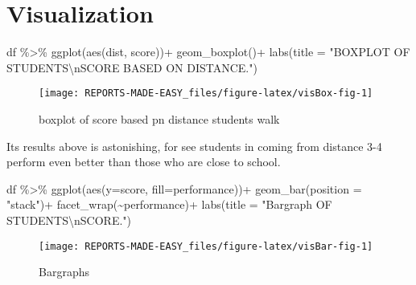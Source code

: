 \documentclass[
]{book}
\newenvironment{Shaded}{\begin{snugshade}}{\end{snugshade}}
\newcommand{\AttributeTok}[1]{\textcolor[rgb]{0.77,0.63,0.00}{#1}}
\newcommand{\FunctionTok}[1]{\textcolor[rgb]{0.00,0.00,0.00}{#1}}
\newcommand{\NormalTok}[1]{#1}
\newcommand{\SpecialCharTok}[1]{\textcolor[rgb]{0.00,0.00,0.00}{#1}}
\newcommand{\StringTok}[1]{\textcolor[rgb]{0.31,0.60,0.02}{#1}}
\begin{document}
\hypertarget{vis}{%
\section{Visualization}\label{vis}}

\begin{Shaded}
\begin{Highlighting}[]
\NormalTok{df }\SpecialCharTok{\%\textgreater{}\%} 
  \FunctionTok{ggplot}\NormalTok{(}\FunctionTok{aes}\NormalTok{(dist, score))}\SpecialCharTok{+}
  \FunctionTok{geom\_boxplot}\NormalTok{()}\SpecialCharTok{+}
  \FunctionTok{labs}\NormalTok{(}\AttributeTok{title =} \StringTok{"BOXPLOT OF STUDENTS\textquotesingle{}}\SpecialCharTok{\textbackslash{}n}\StringTok{SCORE BASED ON DISTANCE."}\NormalTok{)}
\end{Highlighting}
\end{Shaded}

\begin{figure}

{\centering \texttt{[image: REPORTS-MADE-EASY\_files/figure-latex/visBox-fig-1]} 

}

\caption{boxplot of score based pn distance students walk}\label{fig:visBox-fig}
\end{figure}

Its results above is astonishing, for see students in coming from distance 3-4 perform even better than those who are close to school.

\begin{Shaded}
\begin{Highlighting}[]
\NormalTok{df }\SpecialCharTok{\%\textgreater{}\%} 
  \FunctionTok{ggplot}\NormalTok{(}\FunctionTok{aes}\NormalTok{(}\AttributeTok{y=}\NormalTok{score, }\AttributeTok{fill=}\NormalTok{performance))}\SpecialCharTok{+}
  \FunctionTok{geom\_bar}\NormalTok{(}\AttributeTok{position =} \StringTok{"stack"}\NormalTok{)}\SpecialCharTok{+}
  \FunctionTok{facet\_wrap}\NormalTok{(}\SpecialCharTok{\textasciitilde{}}\NormalTok{performance)}\SpecialCharTok{+}
  \FunctionTok{labs}\NormalTok{(}\AttributeTok{title =} \StringTok{"Bargraph OF STUDENTS\textquotesingle{}}\SpecialCharTok{\textbackslash{}n}\StringTok{SCORE."}\NormalTok{)}
\end{Highlighting}
\end{Shaded}

\begin{figure}

{\centering \texttt{[image: REPORTS-MADE-EASY\_files/figure-latex/visBar-fig-1]} 

}

\caption{Bargraphs}\label{fig:visBar-fig-1}
\end{figure}
\end{document}
